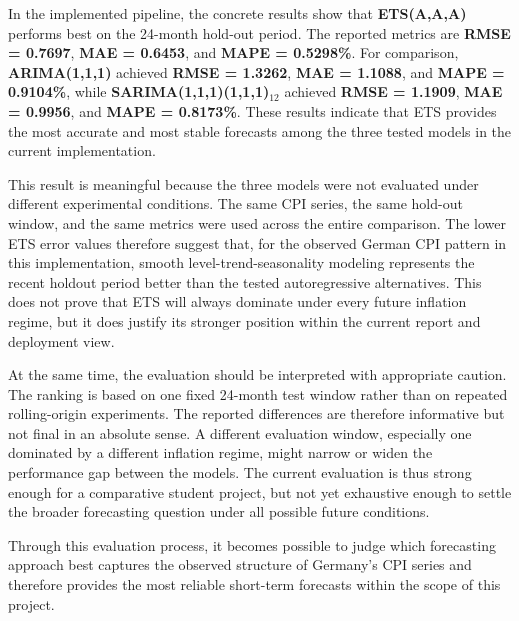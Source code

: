 In the implemented pipeline, the concrete results show that \textbf{ETS(A,A,A)} performs best on the 24-month hold-out period. The reported metrics are \textbf{RMSE = 0.7697}, \textbf{MAE = 0.6453}, and \textbf{MAPE = 0.5298\%}. For comparison, \textbf{ARIMA(1,1,1)} achieved \textbf{RMSE = 1.3262}, \textbf{MAE = 1.1088}, and \textbf{MAPE = 0.9104\%}, while \textbf{SARIMA(1,1,1)(1,1,1)$_{12}$} achieved \textbf{RMSE = 1.1909}, \textbf{MAE = 0.9956}, and \textbf{MAPE = 0.8173\%}. These results indicate that ETS provides the most accurate and most stable forecasts among the three tested models in the current implementation.

This result is meaningful because the three models were not evaluated under different experimental conditions. The same CPI series, the same hold-out window, and the same metrics were used across the entire comparison. The lower ETS error values therefore suggest that, for the observed German CPI pattern in this implementation, smooth level-trend-seasonality modeling represents the recent holdout period better than the tested autoregressive alternatives. This does not prove that ETS will always dominate under every future inflation regime, but it does justify its stronger position within the current report and deployment view.

At the same time, the evaluation should be interpreted with appropriate caution. The ranking is based on one fixed 24-month test window rather than on repeated rolling-origin experiments. The reported differences are therefore informative but not final in an absolute sense. A different evaluation window, especially one dominated by a different inflation regime, might narrow or widen the performance gap between the models. The current evaluation is thus strong enough for a comparative student project, but not yet exhaustive enough to settle the broader forecasting question under all possible future conditions.

Through this evaluation process, it becomes possible to judge which forecasting approach best captures the observed structure of Germany's CPI series and therefore provides the most reliable short-term forecasts within the scope of this project.
